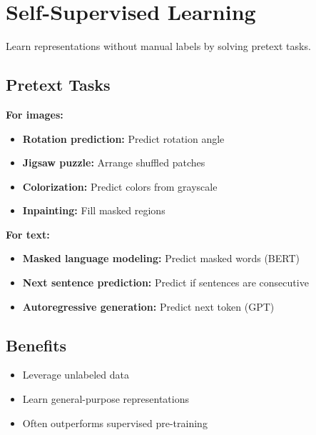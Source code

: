 
\section{Self-Supervised Learning}
\label{sec:self-supervised}

Learn representations without manual labels by solving pretext tasks.

\subsection{Pretext Tasks}

\textbf{For images:}
\begin{itemize}
    \item \textbf{Rotation prediction:} Predict rotation angle
    \item \textbf{Jigsaw puzzle:} Arrange shuffled patches
    \item \textbf{Colorization:} Predict colors from grayscale
    \item \textbf{Inpainting:} Fill masked regions
\end{itemize}

\textbf{For text:}
\begin{itemize}
    \item \textbf{Masked language modeling:} Predict masked words (BERT)
    \item \textbf{Next sentence prediction:} Predict if sentences are consecutive
    \item \textbf{Autoregressive generation:} Predict next token (GPT)
\end{itemize}

\subsection{Benefits}

\begin{itemize}
    \item Leverage unlabeled data
    \item Learn general-purpose representations
    \item Often outperforms supervised pre-training
\end{itemize}

